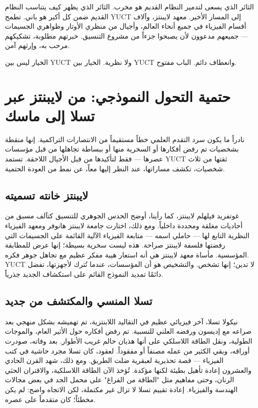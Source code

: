 \documentclass[12pt,a4paper]{article}
\begin{document}
	الثائر الذي يسعى لتدمير النظام القديم هو مخرب. الثائر الذي يظهر كيف يتناسب النظام القديم ضمن كل أكبر هو باني. تطمح YUCT إلى المسار الأخير. معهد لايبنتز، وآلاف أقسام الفيزياء في جميع أنحاء العالم، وأجيال من منظري الأوتار وظواهري الجسيمات — جميعهم مدعوون لأن يصبحوا جزءاً من مشروع التنسيق. خبرتهم مطلوبة، تشكيكهم مرحب به، وإرثهم آمن.
	
	الخيار ليس بين YUCT ولا نظرية. الخيار بين YUCT وانعطاف دائم. الباب مفتوح.
	
	\section{حتمية التحول النموذجي: من لايبنتز عبر تسلا إلى ماسك}
	
	نادراً ما يكون سرد التقدم العلمي خطاً مستقيماً من الانتصارات التراكمية. إنها منقطة بشخصيات تم رفض أفكارها أو السخرية منها أو ببساطة تجاهلها من قبل مؤسسات عصرها — فقط لتأكيدها من قبل الأجيال اللاحقة. تستمد YUCT ثقتها من ثلاث شخصيات، تكشف مساراتها، عند النظر إليها معاً، عن نمط من العودة الحتمية.
	
	\subsection{لايبنتز خانته تسميته}
	
	غوتفريد فيلهلم لايبنتز، كما رأينا، أوضح الحدس الجوهري للتنسيق كتآلف مسبق من أحاديات مغلقة ومحددة داخلياً. ومع ذلك، اختارت جامعة لايبنتز هانوفر ومعهد الفيزياء النظرية التابع لها — حاملي اسمه — متابعة الفيزياء الآلية القائمة على الجسيمات التي رفضتها فلسفة لايبنتز صراحة. هذه ليست سخرية بسيطة؛ إنها عرض للمطابقة المؤسسية. مأساة معهد لايبنتز هي أنه استعار هيبة مفكر عظيم مع تجاهل جوهر فكره. YUCT لا تدين؛ إنها تشخص. والتشخيص هو أن المؤسسات، عندما تُترك لأجهزتها، تفضل دائمًا تمديد النموذج القائم على استكشاف الجديد جذرياً.
	
	\subsection{تسلا المنسي والمكتشف من جديد}
	
	نيكولا تسلا، آخر فيزيائي عظيم في التقاليد اللابنتزية، تم تهميشه بشكل منهجي بعد صراعه مع إديسون ورفضه العلني للنسبية. تم رفض أفكاره حول الأثير العام، والموجات الطولية، ونقل الطاقة اللاسلكي على أنها هذيان حالم غريب الأطوار. بعد وفاته، صودرت أوراقه، وبقي الكثير من عمله مصنفاً أو مفقوداً. لعقود، كان تسلا مجرد حاشية في كتب الفيزياء — قصة تحذيرية لعبقرية ضلت الطريق. ومع ذلك، شهد القرن الحادي والعشرون إعادة تأهيل بطيئة لكنها مؤكدة. تُؤخذ الآن الطاقة اللاسلكية، والاقتران الحثي الرنان، وحتى مفاهيم مثل "الطاقة من الفراغ" على محمل الجد في بعض مجالات الهندسة والفيزياء. إعادة تقييم تسلا لا تزال غير مكتملة، لكن الاتجاه واضح: لم يكن مخطئاً؛ كان متقدماً على عصره.
	
\end{document}
